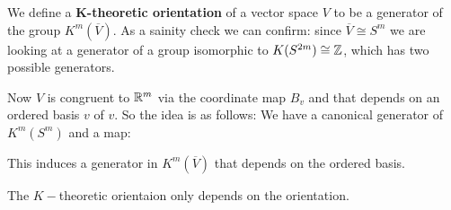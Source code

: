 \begin{definition}

     We define a \textbf{K-theoretic orientation} of a vector space $V$ to be a generator of the group $K^m(\overline{V})$. As a sainity check we can confirm: since $\overline{V}\cong S^m$ we are looking at a generator of a group isomorphic to $K(S^{2m})\cong \mathbb{Z}$, which has two possible generators.

     Now $V$ is congruent to $\mathbb{R}^m$ via the coordinate map $B_v$ and that depends on an ordered  basis $v$ of $v$. So the idea is as follows: 
     We have a canonical generator of $K^m(S^m)$ and a map:
   \begin{center}
   \end{center}
     This induces a generator in $K^m(\overline{V})$ that depends on the ordered basis. 
\end{definition}
\begin{remark} \label{rem: K-orientaion only depends on the orientation}
    The $K-$theoretic orientaion only depends on the orientation.
\end{remark}

